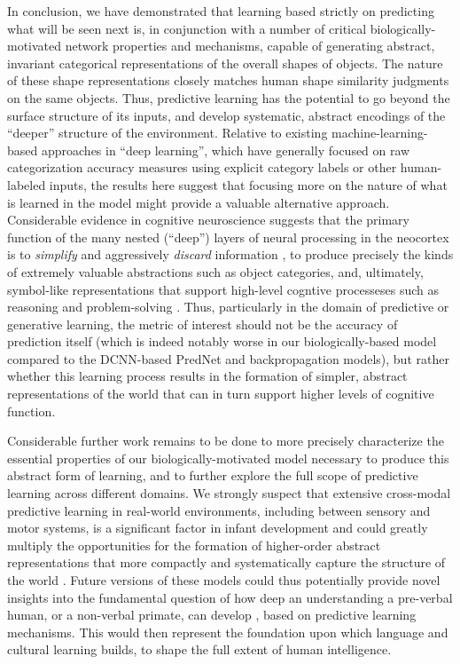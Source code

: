 \documentclass[12pt,twoside]{article}
\newif\myifpdf
\begin{document}
In conclusion, we have demonstrated that learning based strictly on predicting what will be seen next is, in conjunction with a number of critical biologically-motivated network properties and mechanisms, capable of generating abstract, invariant categorical representations of the overall shapes of objects.  The nature of these shape representations closely matches human shape similarity judgments on the same objects.  Thus, predictive learning has the potential to go beyond the surface structure of its inputs, and develop systematic, abstract encodings of the ``deeper'' structure of the environment.  Relative to existing machine-learning-based approaches in ``deep learning'', which have generally focused on raw categorization accuracy measures using explicit category labels or other human-labeled inputs, the results here suggest that focusing more on the nature of what is learned in the model might provide a valuable alternative approach.  Considerable evidence in cognitive neuroscience suggests that the primary function of the many nested (``deep'') layers of neural processing in the neocortex is to {\em simplify} and aggressively {\em discard} information \cite{SimonsRensink05}, to produce precisely the kinds of extremely valuable abstractions such as object categories, and, ultimately, symbol-like representations that support high-level cogntive processeses such as reasoning and problem-solving \cite{RougierNoelleBraverEtAl05,OReillyPetrovCohenEtAl14}.  Thus, particularly in the domain of predictive or generative learning, the metric of interest should not be the accuracy of prediction itself (which is indeed notably worse in our biologically-based model compared to the DCNN-based PredNet and backpropagation models), but rather whether this learning process results in the formation of simpler, abstract representations of the world that can in turn support higher levels of cognitive function.

Considerable further work remains to be done to more precisely characterize the essential properties of our biologically-motivated model necessary to produce this abstract form of learning, and to further explore the full scope of predictive learning across different domains.  We strongly suspect that extensive cross-modal predictive learning in real-world environments, including between sensory and motor systems, is a significant factor in infant development and could greatly multiply the opportunities for the formation of higher-order abstract representations that more compactly and systematically capture the structure of the world \cite{YuSmith12}.  Future versions of these models could thus potentially provide novel insights into the fundamental question of how deep an understanding a pre-verbal human, or a non-verbal primate, can develop \cite{SpelkeBreinlingerMacomberEtAl92,ElmanBatesKarmiloff-SmithEtAl96}, based on predictive learning mechanisms.  This would then represent the foundation upon which language and cultural learning builds, to shape the full extent of human intelligence.
\end{document}
